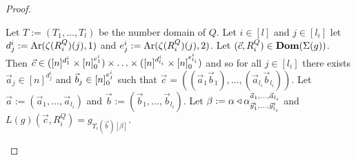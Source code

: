 \documentclass[../main/thesis.tex]{subfiles}
\begin{document}
\begin{proof}
\begin{myitemize}
    Let $T := (T_1, \ldots, T_l)$ be the number domain of $Q$. Let $i \in [l]$
    and $j \in [l_i]$ let $d^i_j := \text{\upshape Ar} (\zeta(R^Q_i)(j), 1)$ and $e^i_j := \text{\upshape Ar}
    (\zeta(R^Q_i)(j), 2)$. Let $(\vec{c}, R^Q_i) \in \text{\textbf{Dom}} (\Sigma(g))$. Then
    $\vec{c} \in ([n]^{d^i_1} \times [n]^{e^i_1}_0) \times \ldots \times
    ([n]^{d^i_{l_i}} \times [n]^{e^i_{l_i}}_0)$ and so for all $j \in
    [l_i]$ there exists $\vec{a}_j \in [n]^{d^i_j}$ and $\vec{b}_j \in
    [n]^{e^i_j}_0$ such that $\vec{c} = ((\vec{a}_1 \vec{b}_1), \ldots,
    (\vec{a}_{l_i} \vec{b}_{l_i}))$. Let $\vec{a} := (\vec{a}_1, \ldots,
    \vec{a}_{l_i})$ and $\vec{b} := (\vec{b}_1, \ldots, \vec{b}_{l_i})$. Let
    $\beta := \alpha \triangleleft\alpha^{\vec{a}_1, \ldots,
        \vec{a}_{l_i}}_{\vec{y}^i_1, \ldots, \vec{y}^i_{l_i}}$ and
    $L(g)(\vec{c} , R^Q_i) = g_{\Upsilon_i(\vec{b})[\beta]}$.
    

\end{myitemize}
\end{proof}
\end{document}
